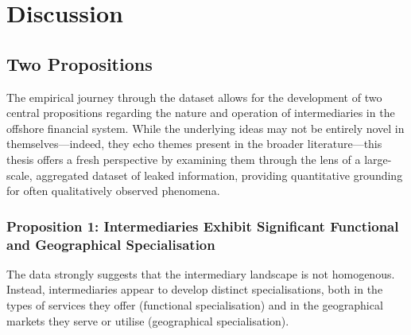 \chapter{Discussion}
\label{chap:discussion}

\section{Two Propositions}
\label{sec:two_propositions}

The empirical journey through the dataset allows for the development of two central propositions regarding the nature and operation of intermediaries in the offshore financial system. While the underlying ideas may not be entirely novel in themselves—indeed, they echo themes present in the broader literature—this thesis offers a fresh perspective by examining them through the lens of a large-scale, aggregated dataset of leaked information, providing quantitative grounding for often qualitatively observed phenomena.

\subsection{Proposition 1: Intermediaries Exhibit Significant Functional and Geographical Specialisation}
\label{subsec:prop1_specialisation}

The data strongly suggests that the intermediary landscape is not homogenous. Instead, intermediaries appear to develop distinct specialisations, both in the types of services they offer (functional specialisation) and in the geographical markets they serve or utilise (geographical specialisation).

